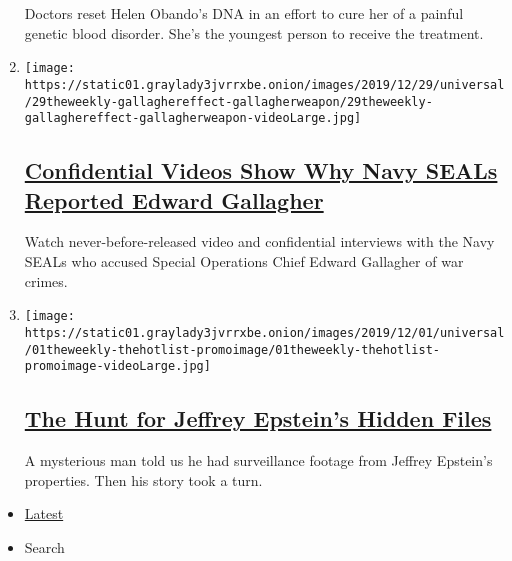 \begin{enumerate}
  Doctors reset Helen Obando's DNA in an effort to cure her of a painful
  genetic blood disorder. She's the youngest person to receive the
  treatment.
\item
  \texttt{[image: https://static01.graylady3jvrrxbe.onion/images/2019/12/29/universal/29theweekly-gallaghereffect-gallagherweapon/29theweekly-gallaghereffect-gallagherweapon-videoLarge.jpg]}

  \hypertarget{confidential-videos-show-why-navy-seals-reported-edward-gallagher}{%
  \subsection{\texorpdfstring{\href{/2019/12/27/the-weekly/eddie-gallagher-navy-seal.html}{Confidential
  Videos Show Why Navy SEALs Reported Edward
  Gallagher}}{Confidential Videos Show Why Navy SEALs Reported Edward Gallagher}}\label{confidential-videos-show-why-navy-seals-reported-edward-gallagher}}

  Watch never-before-released video and confidential interviews with the
  Navy SEALs who accused Special Operations Chief Edward Gallagher of
  war crimes.
\item
  \texttt{[image: https://static01.graylady3jvrrxbe.onion/images/2019/12/01/universal/01theweekly-thehotlist-promoimage/01theweekly-thehotlist-promoimage-videoLarge.jpg]}

  \hypertarget{the-hunt-for-jeffrey-epsteins-hidden-files}{%
  \subsection{\texorpdfstring{\href{/2019/11/29/the-weekly/jeffrey-epstein-secret-videos.html}{The
  Hunt for Jeffrey Epstein's Hidden
  Files}}{The Hunt for Jeffrey Epstein's Hidden Files}}\label{the-hunt-for-jeffrey-epsteins-hidden-files}}

  A mysterious man told us he had surveillance footage from Jeffrey
  Epstein's properties. Then his story took a turn.
\end{enumerate}

\begin{itemize}
\tightlist
\item
  \protect\hyperlink{stream-panel}{Latest}
\item
  Search
\end{itemize}

